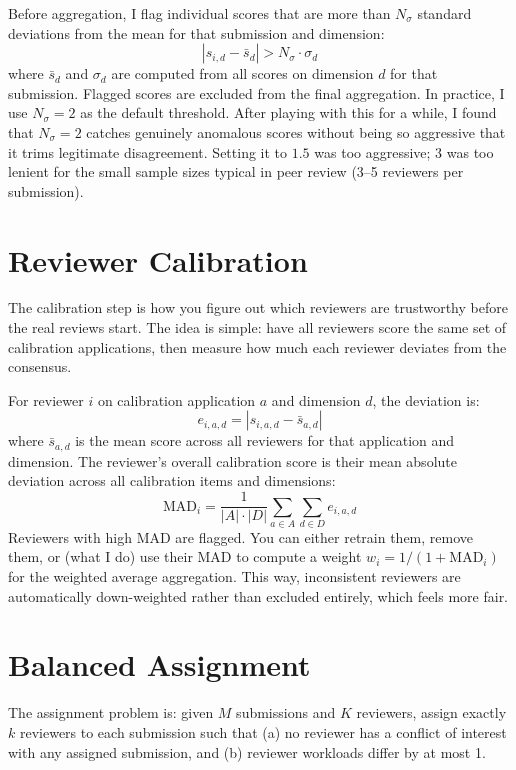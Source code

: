 \documentclass[11pt]{article}
\begin{document}
Before aggregation, I flag individual scores that are more than $N_\sigma$ standard deviations from the mean for that submission and dimension:
\[
    |s_{i,d} - \bar{s}_d| > N_\sigma \cdot \sigma_d
\]
where $\bar{s}_d$ and $\sigma_d$ are computed from all scores on dimension $d$ for that submission. Flagged scores are excluded from the final aggregation. In practice, I use $N_\sigma = 2$ as the default threshold. After playing with this for a while, I found that $N_\sigma = 2$ catches genuinely anomalous scores without being so aggressive that it trims legitimate disagreement. Setting it to $1.5$ was too aggressive; $3$ was too lenient for the small sample sizes typical in peer review (3--5 reviewers per submission).

\section{Reviewer Calibration}

The calibration step is how you figure out which reviewers are trustworthy before the real reviews start. The idea is simple: have all reviewers score the same set of calibration applications, then measure how much each reviewer deviates from the consensus.

For reviewer $i$ on calibration application $a$ and dimension $d$, the deviation is:
\[
    e_{i,a,d} = |s_{i,a,d} - \bar{s}_{a,d}|
\]
where $\bar{s}_{a,d}$ is the mean score across all reviewers for that application and dimension. The reviewer's overall calibration score is their mean absolute deviation across all calibration items and dimensions:
\[
    \text{MAD}_i = \frac{1}{|A| \cdot |D|} \sum_{a \in A} \sum_{d \in D} e_{i,a,d}
\]
Reviewers with high MAD are flagged. You can either retrain them, remove them, or (what I do) use their MAD to compute a weight $w_i = 1 / (1 + \text{MAD}_i)$ for the weighted average aggregation. This way, inconsistent reviewers are automatically down-weighted rather than excluded entirely, which feels more fair.

\section{Balanced Assignment}

The assignment problem is: given $M$ submissions and $K$ reviewers, assign exactly $k$ reviewers to each submission such that (a) no reviewer has a conflict of interest with any assigned submission, and (b) reviewer workloads differ by at most 1.
\end{document}
